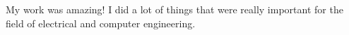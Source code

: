 \begin{thesisabstract}
  My work was amazing! I did a lot of things that were really important for the field of electrical and computer engineering.
\end{thesisabstract}